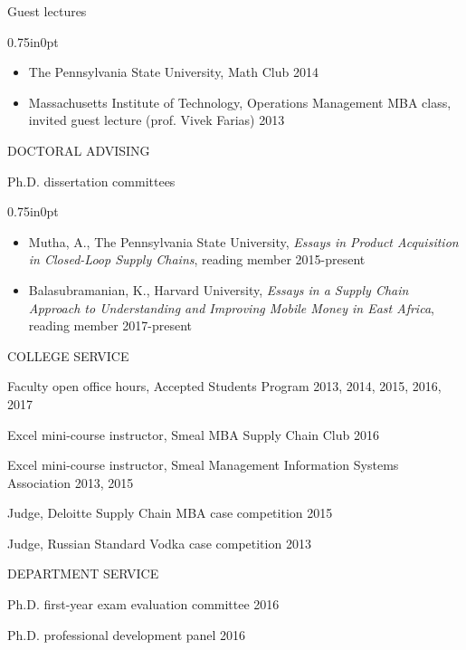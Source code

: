 \documentclass[letterpaper,11pt,oneside]{article}
\newcommand\myIndent{0.75in}
\newcommand\myParSkip{3pt}
\newcommand\myHangIndent{1in}
\newcommand\mySpaceBeforeSection{0.9em}
\newcommand{\NiceIndent}{ \parindent=\myIndent \hangindent=\myHangIndent }
\newenvironment{miniListBullet}
    {
        \begin{adjustwidth}{\myIndent}{0pt}
        \setlength{\parskip}{0pt}%
        \renewcommand\labelitemi{{\boldmath$\cdot$}}
        \begin{itemize}
        \setlength\itemsep{0em}
    }
    {
        \end{itemize}
        \setlength{\parskip}{\myParSkip}%
        \end{adjustwidth}
    }
\begin{document}
\NiceIndent Guest lectures
\begin{miniListBullet}
    \item The Pennsylvania State University, Math Club 2014
    \item Massachusetts Institute of Technology, Operations Management MBA class, invited guest lecture (prof. Vivek Farias) 2013
\end{miniListBullet}

\vspace{\mySpaceBeforeSection}
\noindent DOCTORAL ADVISING

\NiceIndent Ph.D. dissertation committees
\begin{miniListBullet}
    \item Mutha, A., The Pennsylvania State University, \textit{Essays in Product Acquisition in Closed-Loop Supply Chains}, reading member 2015-present 
    \item Balasubramanian, K., Harvard University, \textit{Essays in a Supply Chain Approach to Understanding and Improving Mobile Money in East Africa}, reading member 2017-present
    
\end{miniListBullet}

\vspace{\mySpaceBeforeSection}
\noindent COLLEGE SERVICE

\NiceIndent Faculty open office hours, Accepted Students Program 2013, 2014, 2015, 2016, 2017

\NiceIndent Excel mini-course instructor, Smeal MBA Supply Chain Club 2016

\NiceIndent Excel mini-course instructor, Smeal Management Information Systems Association 2013, 2015

\NiceIndent Judge, Deloitte Supply Chain MBA case competition  2015

\NiceIndent Judge, Russian Standard Vodka case competition  2013

\vspace{\mySpaceBeforeSection}
\noindent DEPARTMENT SERVICE

\NiceIndent Ph.D. first-year exam evaluation committee 2016

\NiceIndent Ph.D. professional development panel 2016
\end{document}
